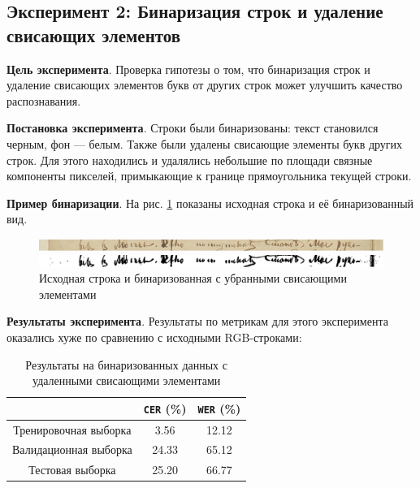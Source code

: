 \documentclass{extarticle}
\begin{document}
\subsection{Эксперимент 2: Бинаризация строк и удаление свисающих элементов}

\textbf{Цель эксперимента}. Проверка гипотезы о том, что бинаризация строк и удаление свисающих элементов букв от других строк может улучшить качество распознавания.

\textbf{Постановка эксперимента}. Строки были бинаризованы: текст становился черным, фон — белым. Также были удалены свисающие элементы букв других строк. Для этого находились и удалялись небольшие по площади связные компоненты пикселей, примыкающие к границе прямоугольника текущей строки.

\textbf{Пример бинаризации}. На рис. \ref{fig:binarize_example} показаны исходная строка и её бинаризованный вид.

\begin{figure}[h!]
	\centering
	\begin{minipage}{0.99\textwidth}
		\centering
		\includegraphics[width=\textwidth]{images/line_original.jpg}
	\end{minipage}
	\begin{minipage}{0.99\textwidth}
		\centering
		\includegraphics[width=\textwidth]{images/line_binarize.jpg}
	\end{minipage}
	
	\caption{Исходная строка и бинаризованная с убранными свисающими элементами}
	\label{fig:binarize_example}
\end{figure}

\textbf{Результаты эксперимента}. Результаты по метрикам для этого эксперимента оказались хуже по сравнению с исходными RGB-строками:

\begin{table}[H]
	\centering
	\begin{tabular}{|c|c|c|}
		\hline
		& \texttt{CER} (\%) & \texttt{WER} (\%) \\
		\hline
		Тренировочная выборка & 3.56 & 12.12 \\
		\hline
		Валидационная выборка & 24.33 & 65.12 \\
		\hline
		Тестовая выборка & 25.20 & 66.77 \\
		\hline
	\end{tabular}
	\caption{Результаты на бинаризованных данных с удаленными свисающими элементами}
	\label{tab:results_bin}
\end{table}
\end{document}
